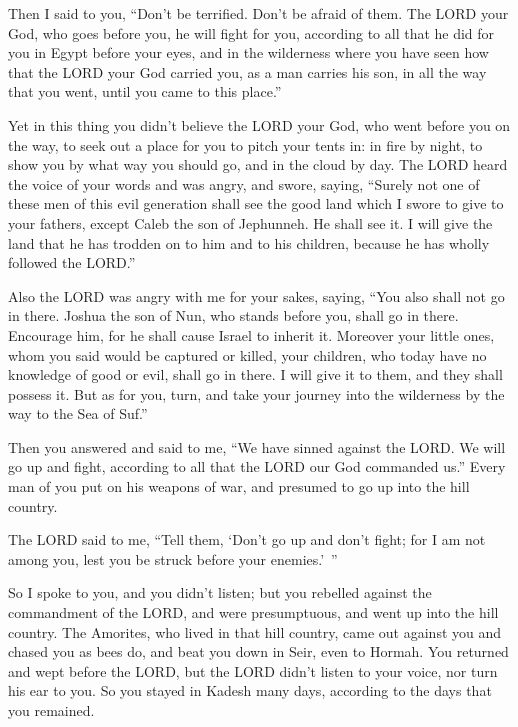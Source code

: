 \myverse{}Then I said to you, “Don’t be terrified. Don’t be afraid of them.
\myverse{}The LORD your God, who goes before you, he will fight for you, according to
all that he did for you in Egypt before your eyes,
\myverse{}and in the wilderness where you have seen how that the LORD your God carried
you, as a man carries his son, in all the way that you went, until you came to this place.”


\myverse{}Yet in this thing you didn’t believe the LORD your God,
\myverse{}who went before you on the way, to seek out a place for you to pitch your
tents in: in fire by night, to show you by what way you should go, and in the cloud by day.
\myverse{}The LORD heard the voice of your words and was angry, and swore, saying,
\myverse{}“Surely not one of these men of this evil generation shall see the good land
which I swore to give to your fathers,
\myverse{}except Caleb the son of Jephunneh. He shall see it. I will give the land that
he has trodden on to him and to his children, because he has wholly followed the LORD.”


\myverse{}Also the LORD was angry with me for your sakes, saying, “You
also shall not go in there.
\myverse{}Joshua the son of Nun, who stands before you, shall go in there. Encourage
him, for he shall cause Israel to inherit it.
\myverse{}Moreover your little ones, whom you said would be captured or killed, your
children, who today have no knowledge of good or evil, shall go in there. I will give it to them, and
they shall possess it.
\myverse{}But as for you, turn, and take your journey into the wilderness by the way
to the Sea of Suf.”


\myverse{}Then you answered and said to me, “We have sinned against the
LORD. We will go up and fight, according to all that the LORD our God commanded us.” Every man of you
put on his weapons of war, and presumed to go up into the hill country.


\myverse{}The LORD said to me, “Tell them, ‘Don’t go up and don’t fight;
for I am not among you, lest you be struck before your enemies.’ ”


\myverse{}So I spoke to you, and you didn’t listen; but you rebelled against
the commandment of the LORD, and were presumptuous, and went up into the hill country.
\myverse{}The Amorites, who lived in that hill country, came out against you and chased
you as bees do, and beat you down in Seir, even to Hormah.
\myverse{}You returned and wept before the LORD, but the LORD didn’t listen to your
voice, nor turn his ear to you.
\myverse{}So you stayed in Kadesh many days, according to the days that you remained.


